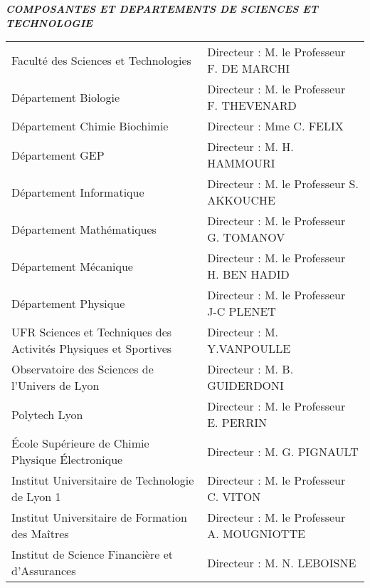 \vfill
\begin{minipage}{0.95\textwidth}
\begin{center}
\vspace{0.5cm}
\textit{\textbf{COMPOSANTES ET DEPARTEMENTS DE SCIENCES ET TECHNOLOGIE}}
\vspace{0.2cm}
\begin{footnotesize}
\begin{tabular}{p{8cm}p{6.75cm}}
Faculté des Sciences et Technologies & Directeur : M. le Professeur F. DE MARCHI\\
Département Biologie & Directeur : M. le Professeur F. THEVENARD\\
Département Chimie Biochimie & Directeur : Mme C. FELIX\\
Département GEP & Directeur : M. H. HAMMOURI\\
Département Informatique & Directeur : M. le Professeur S. AKKOUCHE\\
Département Mathématiques & Directeur : M. le Professeur G. TOMANOV\\
Département Mécanique & Directeur : M. le Professeur H. BEN HADID\\
Département Physique & Directeur :  M. le Professeur J-C PLENET \\
UFR Sciences et Techniques des Activités Physiques et Sportives & Directeur : M. Y.VANPOULLE   \\
Observatoire des Sciences de l’Univers de Lyon & Directeur : M. B. GUIDERDONI \\
Polytech Lyon & Directeur : M. le Professeur E. PERRIN\\
École Supérieure de Chimie Physique Électronique & Directeur : M. G. PIGNAULT\\
Institut Universitaire de Technologie de Lyon 1 & Directeur : M. le Professeur C. VITON\\
Institut Universitaire de Formation des Maîtres & Directeur : M. le Professeur A. MOUGNIOTTE\\
Institut de Science Financière et d'Assurances & Directeur : M. N. LEBOISNE
\end{tabular}
\end{footnotesize}
\end{center}
\end{minipage}
\newpage\thispagestyle{empty}
\null
\newpage


\restoregeometry
